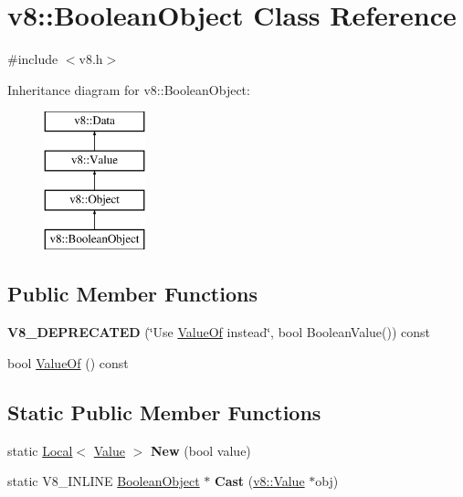 \hypertarget{classv8_1_1_boolean_object}{}\section{v8\+:\+:Boolean\+Object Class Reference}
\label{classv8_1_1_boolean_object}


{\ttfamily \#include $<$v8.\+h$>$}

Inheritance diagram for v8\+:\+:Boolean\+Object\+:\begin{figure}[H]
\begin{center}
\leavevmode
\includegraphics[height=4.000000cm]{classv8_1_1_boolean_object}
\end{center}
\end{figure}
\subsection*{Public Member Functions}
\begin{DoxyCompactItemize}
\item 
\hypertarget{classv8_1_1_boolean_object_a3274c00d90598f00d3d27aab82d26d40}{}{\bfseries V8\+\_\+\+D\+E\+P\+R\+E\+C\+A\+T\+E\+D} (\char`\"{}Use \hyperlink{classv8_1_1_boolean_object_a283419656e641bcd9588dee56c0a0686}{Value\+Of} instead\char`\"{}, bool Boolean\+Value()) const \label{classv8_1_1_boolean_object_a3274c00d90598f00d3d27aab82d26d40}

\item 
bool \hyperlink{classv8_1_1_boolean_object_a283419656e641bcd9588dee56c0a0686}{Value\+Of} () const 
\end{DoxyCompactItemize}
\subsection*{Static Public Member Functions}
\begin{DoxyCompactItemize}
\item 
\hypertarget{classv8_1_1_boolean_object_af57ca9198a6c6d00617da80b3f705e37}{}static \hyperlink{classv8_1_1_local}{Local}$<$ \hyperlink{classv8_1_1_value}{Value} $>$ {\bfseries New} (bool value)\label{classv8_1_1_boolean_object_af57ca9198a6c6d00617da80b3f705e37}

\item 
\hypertarget{classv8_1_1_boolean_object_ac701398c9b1c74fbce31d66106c9a87f}{}static V8\+\_\+\+I\+N\+L\+I\+N\+E \hyperlink{classv8_1_1_boolean_object}{Boolean\+Object} $\ast$ {\bfseries Cast} (\hyperlink{classv8_1_1_value}{v8\+::\+Value} $\ast$obj)\label{classv8_1_1_boolean_object_ac701398c9b1c74fbce31d66106c9a87f}

\end{DoxyCompactItemize}


